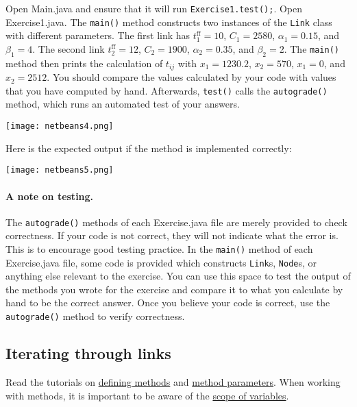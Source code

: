 \documentclass[11pt]{article}
\begin{document}
\noindent Open Main.java and ensure that it will run \texttt{Exercise1.test();}.
Open Exercise1.java. The \texttt{main()} method constructs two instances of the \texttt{Link} class with different parameters. The first link has $t^{\mathrm{ff}}_{1}=10$, $C_{1}=2580$, $\alpha_{1}=0.15$, and $\beta_{1}=4$. The second link $t^{\mathrm{ff}}_{2}=12$, $C_{2}=1900$, $\alpha_{2}=0.35$, and $\beta_{2}=2$. The \texttt{main()} method then prints the calculation of $t_{ij}$ with $x_{1}=1230.2$, $x_2=570$, $x_1=0$, and $x_2=2512$. You should compare the values calculated by your code with values that you have computed by hand. 
Afterwards, \texttt{test()} calls the \texttt{autograde()} method, which runs an automated test of your answers. 
	
	
	\begin{center}
	\texttt{[image: netbeans4.png]}
\end{center}
	
Here is the expected output if the method is implemented correctly:


	\begin{center}
	\texttt{[image: netbeans5.png]}
\end{center}	
	
	
	\paragraph*{A note on testing.} The \texttt{autograde()} methods of each Exercise.java file are merely provided to check correctness. If your code is not correct, they will not indicate what the error is. This is to encourage good testing practice. In the \texttt{main()} method of each Exercise.java file, some code is provided which constructs \texttt{Link}s, \texttt{Node}s, or anything else relevant to the exercise. You can use this space to test the output of the methods you wrote for the exercise and compare it to what you calculate by hand to be the correct answer. Once you believe your code is correct, use the \texttt{autograde()} method to verify correctness.
	
	
	
\subsection{Iterating through links}
\label{sec22}	
	
Read the tutorials on \href{https://www.w3schools.com/java/java_methods.asp}{defining methods} and \href{https://www.w3schools.com/java/java_methods_param.asp}{method parameters}.  When working with methods, it is important to be aware of the \href{https://www.w3schools.com/java/java_scope.asp}{scope of variables}. 
	
\end{document}
